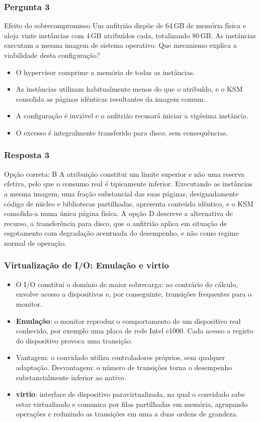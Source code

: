 \documentclass[aspectratio=169]{beamer}
\begin{document}
\begin{frame}
\frametitle{Pergunta 3}
\begin{pergunta}{Efeito do sobrecompromisso}
Um anfitrião dispõe de 64\,GB de memória física e aloja vinte instâncias com 4\,GB atribuídos cada, totalizando 80\,GB. As instâncias executam a mesma imagem de sistema operativo. Que mecanismo explica a viabilidade desta configuração?
\begin{itemize}
    \item[A)] O hypervisor comprime a memória de todas as instâncias.
    \item[B)] As instâncias utilizam habitualmente menos do que o atribuído, e o KSM consolida as páginas idênticas resultantes da imagem comum.
    \item[C)] A configuração é inviável e o anfitrião recusará iniciar a vigésima instância.
    \item[D)] O excesso é integralmente transferido para disco, sem consequências.
\end{itemize}
\end{pergunta}
\end{frame}

\begin{frame}
\frametitle{Resposta 3}
\begin{resposta}{Opção correta: B}
A atribuição constitui um limite superior e não uma reserva efetiva, pelo que o consumo real é tipicamente inferior. Executando as instâncias a mesma imagem, uma fração substancial das suas páginas, designadamente código de núcleo e bibliotecas partilhadas, apresenta conteúdo idêntico, e o KSM consolida-a numa única página física. A opção D descreve a alternativa de recurso, a transferência para disco, que o anfitrião aplica em situação de esgotamento com degradação acentuada do desempenho, e não como regime normal de operação.
\end{resposta}
\end{frame}

\begin{frame}
\frametitle{Virtualização de I/O: Emulação e virtio}
\begin{itemize}
    \setlength\itemsep{0.35cm}
    \item O I/O constitui o domínio de maior sobrecarga: ao contrário do cálculo, envolve acesso a dispositivos e, por conseguinte, transições frequentes para o monitor.
    \item \textbf{Emulação}: o monitor reproduz o comportamento de um dispositivo real conhecido, por exemplo uma placa de rede Intel e1000. Cada acesso a registo do dispositivo provoca uma transição.
    \item Vantagem: o convidado utiliza controladores próprios, sem qualquer adaptação. Desvantagem: o número de transições torna o desempenho substancialmente inferior ao nativo.
    \item \textbf{virtio}: interface de dispositivo paravirtualizada, na qual o convidado sabe estar virtualizado e comunica por filas partilhadas em memória, agrupando operações e reduzindo as transições em uma a duas ordens de grandeza.
\end{itemize}
\end{frame}
\end{document}
